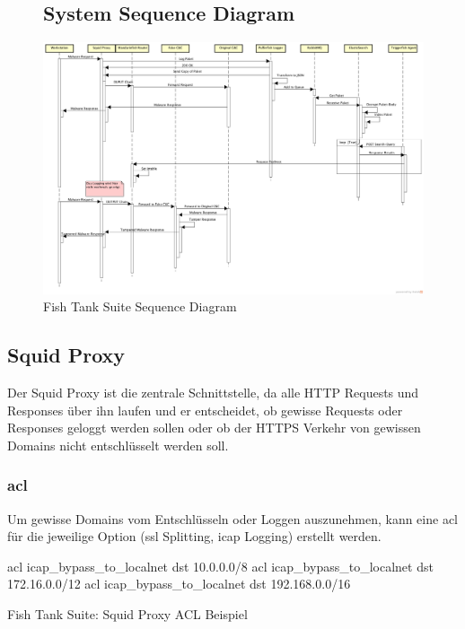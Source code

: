 \begin{figure}[H]
	\subsection{System Sequence Diagram}
	\centering
	\includegraphics[width=\textwidth]{img/SequenceDiagram.png}
	\caption{Fish Tank Suite Sequence Diagram}
	\label{fig:Fish_Tank_Suite_Sequence_Diagram}
\end{figure}

\subsection{Squid Proxy}
\label{fts:squid}
Der Squid Proxy ist die zentrale Schnittstelle, da alle HTTP Requests und Responses über ihn laufen und er entscheidet, ob gewisse Requests oder Responses geloggt werden sollen oder ob der HTTPS Verkehr von gewissen Domains nicht entschlüsselt werden soll.

\subsubsection{\gls{acl}}
Um gewisse Domains vom Entschlüsseln oder Loggen auszunehmen, kann eine \gls{acl} für die jeweilige Option (\gls{ssl} Splitting, \gls{icap} Logging) erstellt werden.

\begin{listing}[H]
\begin{fancycode}
acl icap_bypass_to_localnet dst 10.0.0.0/8
acl icap_bypass_to_localnet dst 172.16.0.0/12 
acl icap_bypass_to_localnet dst 192.168.0.0/16
\end{fancycode}
\caption{Fish Tank Suite: Squid Proxy ACL Beispiel}
\label{lst:squid-proxy-acl}
\end{listing}

